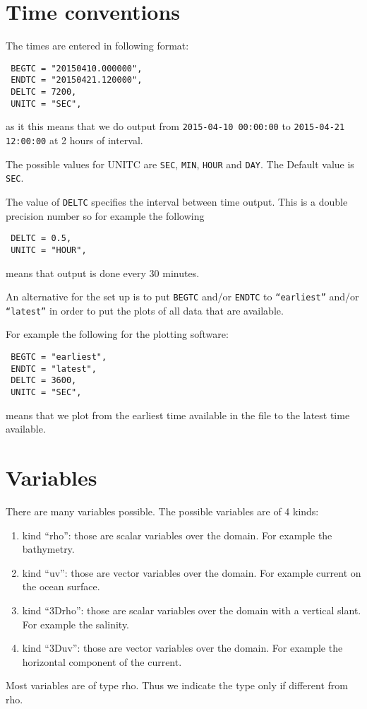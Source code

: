 \documentclass[12pt]{amsart}
\begin{document}
\section{Time conventions}
The times are entered in following format:
\begin{verbatim}
 BEGTC = "20150410.000000",
 ENDTC = "20150421.120000",
 DELTC = 7200, 
 UNITC = "SEC", 
\end{verbatim}
as it this means that we do output from {\tt 2015-04-10 00:00:00} to {\tt 2015-04-21 12:00:00} at 2 hours of interval.

The possible values for UNITC are {\tt SEC}, {\tt MIN}, {\tt HOUR} and {\tt DAY}. The Default value is {\tt SEC}.

The value of {\tt DELTC} specifies the interval between time output. This is a double precision number so for example the following
\begin{verbatim}
 DELTC = 0.5, 
 UNITC = "HOUR", 
\end{verbatim}
means that output is done every $30$ minutes.

An alternative for the set up is to put {\tt BEGTC} and/or {\tt ENDTC}
to {\tt ``earliest''} and/or {\tt ``latest''} in order to put the plots
of all data that are available.

For example the following for the plotting software:
\begin{verbatim}
 BEGTC = "earliest",
 ENDTC = "latest",
 DELTC = 3600, 
 UNITC = "SEC", 
\end{verbatim}
means that we plot from the earliest time available in the file to the
latest time available.



\section{Variables}

There are many variables possible. The possible variables are of 4 kinds:
\begin{enumerate}
\item kind ``rho'': those are scalar variables over the domain. For example the bathymetry.
\item kind ``uv'': those are vector variables over the domain. For example current on the ocean surface.
\item kind ``3Drho'': those are scalar variables over the domain with a vertical slant. For example the salinity.
\item kind ``3Duv'': those are vector variables over the domain. For example the horizontal component of the current.
\end{enumerate}
Most variables are of type rho. Thus we indicate the type only if different from rho.
\end{document}
